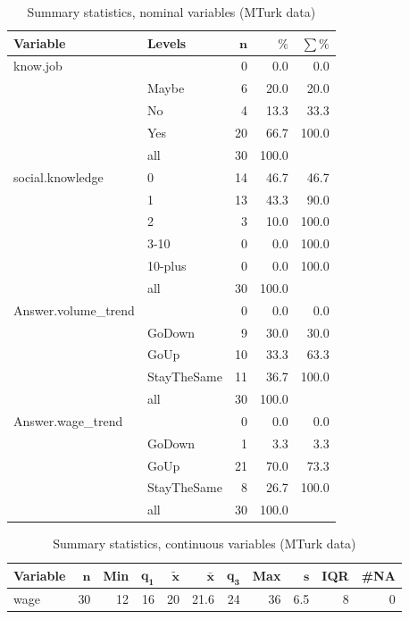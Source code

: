 \documentclass[a4paper,10pt]{article}\usepackage[]{graphicx}\usepackage[]{color}
\begin{document}
\begin{table}[ht]
\centering
{\footnotesize
\begin{tabular}{ll|rrr}
 \textbf{Variable} & \textbf{Levels} & $\mathbf{n}$ & $\mathbf{\%}$ & $\mathbf{\sum \%}$ \\ 
  \hline
know.job &  & 0 & 0.0 & 0.0 \\ 
   & Maybe & 6 & 20.0 & 20.0 \\ 
   & No & 4 & 13.3 & 33.3 \\ 
   & Yes & 20 & 66.7 & 100.0 \\ 
   \hline
 & all & 30 & 100.0 &  \\ 
   \hline
\hline
social.knowledge & 0 & 14 & 46.7 & 46.7 \\ 
   & 1 & 13 & 43.3 & 90.0 \\ 
   & 2 & 3 & 10.0 & 100.0 \\ 
   & 3-10 & 0 & 0.0 & 100.0 \\ 
   & 10-plus & 0 & 0.0 & 100.0 \\ 
   \hline
 & all & 30 & 100.0 &  \\ 
   \hline
\hline
Answer.volume\_trend &  & 0 & 0.0 & 0.0 \\ 
   & GoDown & 9 & 30.0 & 30.0 \\ 
   & GoUp & 10 & 33.3 & 63.3 \\ 
   & StayTheSame & 11 & 36.7 & 100.0 \\ 
   \hline
 & all & 30 & 100.0 &  \\ 
   \hline
\hline
Answer.wage\_trend &  & 0 & 0.0 & 0.0 \\ 
   & GoDown & 1 & 3.3 & 3.3 \\ 
   & GoUp & 21 & 70.0 & 73.3 \\ 
   & StayTheSame & 8 & 26.7 & 100.0 \\ 
   \hline
 & all & 30 & 100.0 &  \\ 
   \hline
\hline
\end{tabular}
}
\caption{Summary statistics, nominal variables (MTurk data)} 
\label{tab1:51-4120}
\end{table}
\begin{table}[ht]
\centering
{\footnotesize
\begin{tabular}{lrrrrrrrrrr}
 \textbf{Variable} & $\mathbf{n}$ & \textbf{Min} & $\mathbf{q_1}$ & $\mathbf{\widetilde{x}}$ & $\mathbf{\bar{x}}$ & $\mathbf{q_3}$ & \textbf{Max} & $\mathbf{s}$ & \textbf{IQR} & \textbf{\#NA} \\ 
  \hline
wage & 30 & 12 & 16 & 20 & 21.6 & 24 & 36 & 6.5 & 8 & 0 \\ 
  \end{tabular}
}
\caption{Summary statistics, continuous variables (MTurk data)} 
\label{tab2:51-4120}
\end{table}
\end{document}
